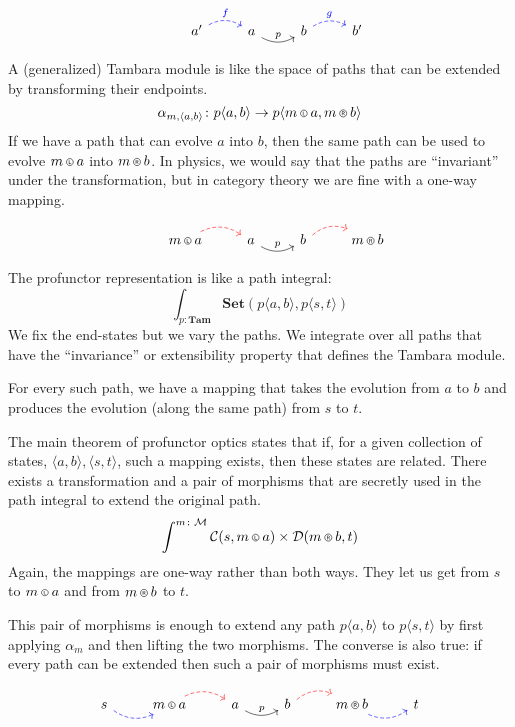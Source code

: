 \documentclass[11pt]{amsart}
\newcommand*\circled[3]
  {\tikz[baseline={([yshift=#2]current bounding box.center)}]{
      \node[shape=circle,draw,inner sep=#1] (char) {#3};}}
\newcommand{\actL}{\mathbin{\circled{0.5pt}{-0.55ex}{\scalebox{0.75}{\tiny{$\mathsf{L}$}}}}}
\newcommand{\actR}{\mathbin{\circled{0.5pt}{-0.55ex}{\scalebox{0.75}{\tiny{$\mathsf{R}$}}}}}
\begin{document}
\[
 \begin{tikzcd}
  & a'
  \arrow[r, bend left, dashed, blue, "f"]
 & a
 \arrow[r, bend right, "p"]
 & b
  \arrow[r, bend left, dashed, blue, "g"]
 &  b'
  \end{tikzcd}
\]



A (generalized) Tambara module is like the space of paths that can be extended by transforming their endpoints.
\[ \alpha_{m, \langle a, b \rangle} \colon p \langle a, b \rangle \to p \langle m \actL a, m \actR b\rangle \]
If we have a path that can evolve $a$ into $b$, then the same path can be used to evolve $m \actL a$ into $m \actR b$. In physics, we would say that the paths are ``invariant'' under the transformation, but in category theory we are fine with a one-way mapping.

\[
 \begin{tikzcd}
  & m \actL a
  \arrow[r, bend left, dashed, red]
 & a
 \arrow[r, bend right, "p"]
 & b
  \arrow[r, bend left, dashed, red]
 & m \actR b
  \end{tikzcd}
\]


The profunctor representation is like a path integral:
\[ \int_{p \colon \mathbf{Tam}} \mathbf{Set}( p \langle a, b \rangle, p \langle s, t \rangle) \]
We fix the end-states but we vary the paths. We integrate over all paths that have the ``invariance'' or extensibility property that defines the Tambara module. 

For every such path, we have a mapping that takes the evolution from $a$ to $b$ and produces the evolution (along the same path) from $s$ to $t$. 

The main theorem of profunctor optics states that if, for a given collection of states, $ \langle a, b \rangle,  \langle s, t \rangle$, such a mapping exists, then these states are related. There exists a transformation and a pair of morphisms that are secretly used in the path integral to extend the original path.
\[ \int^{m \colon \mathcal{M}} \mathcal{C}(s, m \actL a) \times \mathcal{D}(m \actR b, t)\]
Again, the mappings are one-way rather than both ways. They let us get from $s$ to $m \actL a$ and from $m \actR b$ to $t$. 

This pair of morphisms is enough to extend any path $p \langle a, b \rangle$ to  $p \langle s, t \rangle$ by first applying $\alpha_m$ and then lifting the two morphisms. The converse is also true: if every path can be extended then such a pair of morphisms must exist.

\[
 \begin{tikzcd}
 s
 \arrow[r, bend right, dashed, blue]
 & m \actL a
  \arrow[r, bend left, dashed, red]
  & a
 \arrow[r, bend right, "p"]
 & b
  \arrow[r, bend left, dashed, red]
 & m \actR b
 \arrow[r, bend right, dashed, blue]
 & t
 \end{tikzcd}
\]
\end{document}
